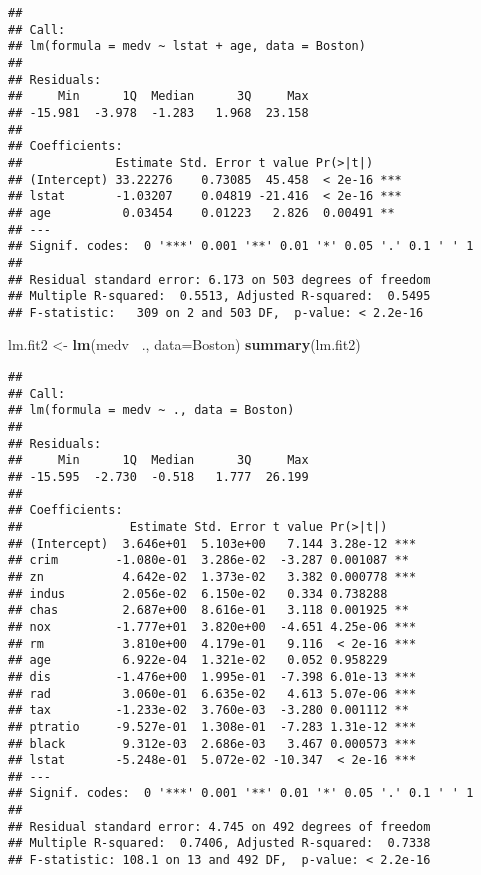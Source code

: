 \documentclass[
]{article}
\newenvironment{Shaded}{\begin{snugshade}}{\end{snugshade}}
\newcommand{\DataTypeTok}[1]{\textcolor[rgb]{0.13,0.29,0.53}{#1}}
\newcommand{\KeywordTok}[1]{\textcolor[rgb]{0.13,0.29,0.53}{\textbf{#1}}}
\newcommand{\NormalTok}[1]{#1}
\newcommand{\OperatorTok}[1]{\textcolor[rgb]{0.81,0.36,0.00}{\textbf{#1}}}
\newcommand{\StringTok}[1]{\textcolor[rgb]{0.31,0.60,0.02}{#1}}
\begin{document}
\begin{verbatim}
## 
## Call:
## lm(formula = medv ~ lstat + age, data = Boston)
## 
## Residuals:
##     Min      1Q  Median      3Q     Max 
## -15.981  -3.978  -1.283   1.968  23.158 
## 
## Coefficients:
##             Estimate Std. Error t value Pr(>|t|)    
## (Intercept) 33.22276    0.73085  45.458  < 2e-16 ***
## lstat       -1.03207    0.04819 -21.416  < 2e-16 ***
## age          0.03454    0.01223   2.826  0.00491 ** 
## ---
## Signif. codes:  0 '***' 0.001 '**' 0.01 '*' 0.05 '.' 0.1 ' ' 1
## 
## Residual standard error: 6.173 on 503 degrees of freedom
## Multiple R-squared:  0.5513, Adjusted R-squared:  0.5495 
## F-statistic:   309 on 2 and 503 DF,  p-value: < 2.2e-16
\end{verbatim}

\begin{Shaded}
\begin{Highlighting}[]
\NormalTok{lm.fit2 <-}\StringTok{ }\KeywordTok{lm}\NormalTok{(medv }\OperatorTok{~}\NormalTok{., }\DataTypeTok{data=}\NormalTok{Boston)}
\KeywordTok{summary}\NormalTok{(lm.fit2)}
\end{Highlighting}
\end{Shaded}

\begin{verbatim}
## 
## Call:
## lm(formula = medv ~ ., data = Boston)
## 
## Residuals:
##     Min      1Q  Median      3Q     Max 
## -15.595  -2.730  -0.518   1.777  26.199 
## 
## Coefficients:
##               Estimate Std. Error t value Pr(>|t|)    
## (Intercept)  3.646e+01  5.103e+00   7.144 3.28e-12 ***
## crim        -1.080e-01  3.286e-02  -3.287 0.001087 ** 
## zn           4.642e-02  1.373e-02   3.382 0.000778 ***
## indus        2.056e-02  6.150e-02   0.334 0.738288    
## chas         2.687e+00  8.616e-01   3.118 0.001925 ** 
## nox         -1.777e+01  3.820e+00  -4.651 4.25e-06 ***
## rm           3.810e+00  4.179e-01   9.116  < 2e-16 ***
## age          6.922e-04  1.321e-02   0.052 0.958229    
## dis         -1.476e+00  1.995e-01  -7.398 6.01e-13 ***
## rad          3.060e-01  6.635e-02   4.613 5.07e-06 ***
## tax         -1.233e-02  3.760e-03  -3.280 0.001112 ** 
## ptratio     -9.527e-01  1.308e-01  -7.283 1.31e-12 ***
## black        9.312e-03  2.686e-03   3.467 0.000573 ***
## lstat       -5.248e-01  5.072e-02 -10.347  < 2e-16 ***
## ---
## Signif. codes:  0 '***' 0.001 '**' 0.01 '*' 0.05 '.' 0.1 ' ' 1
## 
## Residual standard error: 4.745 on 492 degrees of freedom
## Multiple R-squared:  0.7406, Adjusted R-squared:  0.7338 
## F-statistic: 108.1 on 13 and 492 DF,  p-value: < 2.2e-16
\end{verbatim}
\end{document}

